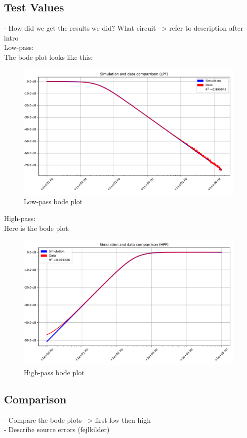 \subsection{Test Values}
- How did we get the results we did? What circuit --> refer to description after intro \\
Low-pass: \\
The bode plot looks like this:
\begin{figure}[H]
\center
	\includegraphics[scale=0.5]{fig/img/bode_LPF_plot.pdf}
	\caption{Low-pass bode plot}
	\label{lp:bode}
\end{figure}
High-pass: \\
Here is the bode plot:
\begin{figure}[H]
\center
	\includegraphics[scale=0.5]{fig/img/bode_HPF_plot.pdf}
	\caption{High-pass bode plot}
	\label{hp:bode}
\end{figure}
\subsection{Comparison}
- Compare the bode plots --> first low then high \\
- Describe source errors (fejlkilder) 